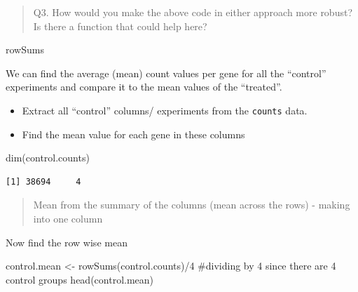 \documentclass[
  letterpaper,
  DIV=11,
  numbers=noendperiod]{scrartcl}
\newenvironment{Shaded}{\begin{snugshade}}{\end{snugshade}}
\newcommand{\CommentTok}[1]{\textcolor[rgb]{0.37,0.37,0.37}{#1}}
\newcommand{\DecValTok}[1]{\textcolor[rgb]{0.68,0.00,0.00}{#1}}
\newcommand{\FunctionTok}[1]{\textcolor[rgb]{0.28,0.35,0.67}{#1}}
\newcommand{\NormalTok}[1]{\textcolor[rgb]{0.00,0.23,0.31}{#1}}
\newcommand{\OtherTok}[1]{\textcolor[rgb]{0.00,0.23,0.31}{#1}}
\newcommand{\SpecialCharTok}[1]{\textcolor[rgb]{0.37,0.37,0.37}{#1}}
\newcommand{\StringTok}[1]{\textcolor[rgb]{0.13,0.47,0.30}{#1}}
\providecommand{\tightlist}{%
  \setlength{\itemsep}{0pt}\setlength{\parskip}{0pt}}\usepackage{longtable,booktabs,array}
\begin{document}
\begin{quote}
Q3. How would you make the above code in either approach more robust? Is
there a function that could help here?
\end{quote}

rowSums

We can find the average (mean) count values per gene for all the
``control'' experiments and compare it to the mean values of the
``treated''.

\begin{itemize}
\tightlist
\item
  Extract all ``control'' columns/ experiments from the \texttt{counts}
  data.
\item
  Find the mean value for each gene in these columns
\end{itemize}

\begin{Shaded}
\end{Shaded}

\begin{Shaded}
\begin{Highlighting}[]
\FunctionTok{dim}\NormalTok{(control.counts)}
\end{Highlighting}
\end{Shaded}

\begin{verbatim}
[1] 38694     4
\end{verbatim}

\begin{quote}
Mean from the summary of the columns (mean across the rows) - making
into one column
\end{quote}

Now find the row wise mean

\begin{Shaded}
\begin{Highlighting}[]
\NormalTok{control.mean }\OtherTok{\textless{}{-}} \FunctionTok{rowSums}\NormalTok{(control.counts)}\SpecialCharTok{/}\DecValTok{4}
\CommentTok{\#dividing by 4 since there are 4 control groups }
\FunctionTok{head}\NormalTok{(control.mean)}
\end{Highlighting}
\end{Shaded}
\end{document}
